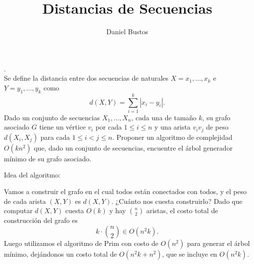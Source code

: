 \documentclass{article}
\author{Daniel Bustos}
\title{Distancias de Secuencias}
\begin{document}
. \\
 Se define la distancia entre dos secuencias de naturales \( X = x_1, \ldots, x_k \) e \( Y = y_1, \ldots, y_k \) como
\[
d(X, Y) = \sum_{i=1}^k |x_i - y_i|.
\]
Dado un conjunto de secuencias \( X_1, \ldots, X_n \), cada una de tamaño \( k \), su grafo asociado \( G \) tiene un vértice \( v_i \) por cada \( 1 \leq i \leq n \) y una arista \( v_i v_j \) de peso \( d(X_i, X_j) \) para cada \( 1 \leq i < j \leq n \). Proponer un algoritmo de complejidad \( O(kn^2) \) que, dado un conjunto de secuencias, encuentre el árbol generador mínimo de su grafo asociado.

Idea del algoritmo:

Vamos a construir el grafo en el cual todos están conectados con todos, y el peso de cada arista \( (X, Y) \) es \( d(X, Y) \). ¿Cuánto nos cuesta construirlo? Dado que computar \( d(X, Y) \) cuesta \( O(k) \) y hay \( \binom{n}{2} \) aristas, el costo total de construcción del grafo es
\[
k \cdot \binom{n}{2} \in O(n^2 k).
\]
Luego utilizamos el algoritmo de Prim con costo de \( O(n^2) \) para generar el árbol mínimo, dejándonos un costo total de \( O(n^2 k + n^2) \), que se incluye en \( O(n^2 k) \).
\end{document}
